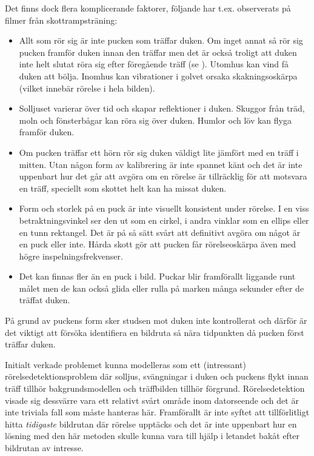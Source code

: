 \documentclass[a4paper,12pt]{article}
\begin{document}
Det finns dock flera komplicerande faktorer, följande har t.ex.
observerats på filmer från skottrampsträning:
\begin{itemize}
  \item Allt som rör sig är inte pucken som träffar duken. Om inget annat så
    rör sig pucken framför duken innan den träffar men det är också troligt
    att duken inte helt slutat röra sig efter föregående träff (se
    \cite{Nockert:2018a}). Utomhus kan vind få duken att bölja. Inomhus kan
    vibrationer i golvet orsaka skakningsoskärpa (vilket innebär rörelse i
    hela bilden).
  \item Solljuset varierar över tid och skapar reflektioner i duken. Skuggor
    från träd, moln och fönsterbågar kan röra sig över duken. Humlor och löv
    kan flyga framför duken.
  \item Om pucken träffar ett hörn rör sig duken väldigt lite jämfört med en
    träff i mitten. Utan någon form av kalibrering är inte spannet känt och
    det är inte uppenbart hur det går att avgöra om en rörelse är tillräcklig
    för att motsvara en träff, speciellt som skottet helt kan ha missat duken.
  \item Form och storlek på en puck är inte visuellt konsistent under rörelse.
    I en viss betraktningsvinkel ser den ut som en cirkel, i andra vinklar som
    en ellips eller en tunn rektangel. Det är på så sätt svårt att definitivt
    avgöra om något är en puck eller inte. Hårda skott gör att pucken får
    rörelseoskärpa även med högre inspelningsfrekvenser.
  \item Det kan finnas fler än en puck i bild. Puckar blir framförallt
    liggande runt målet men de kan också glida eller rulla på marken många
    sekunder efter de träffat duken.
\end{itemize}

På grund av puckens form sker studsen mot duken inte kontrollerat och därför
är det viktigt att försöka identifiera en bildruta så nära tidpunkten då
pucken först träffar duken.

Initialt verkade problemet kunna modelleras som ett (intressant)
rörelsedetektionsproblem där solljus, svängningar i duken och puckens flykt
innan träff tillhör bakgrundsmodellen och träffbilden tillhör förgrund.
Rörelsedetektion visade sig dessvärre vara ett relativt svårt område inom
datorseende och det är inte triviala fall som måste hanteras här. Framförallt
är inte syftet att tillförlitligt hitta \textit{tidigaste} bildrutan där
rörelse upptäcks och det är inte uppenbart hur en lösning med den här metoden
skulle kunna vara till hjälp i letandet bakåt efter bildrutan av intresse.
\end{document}
